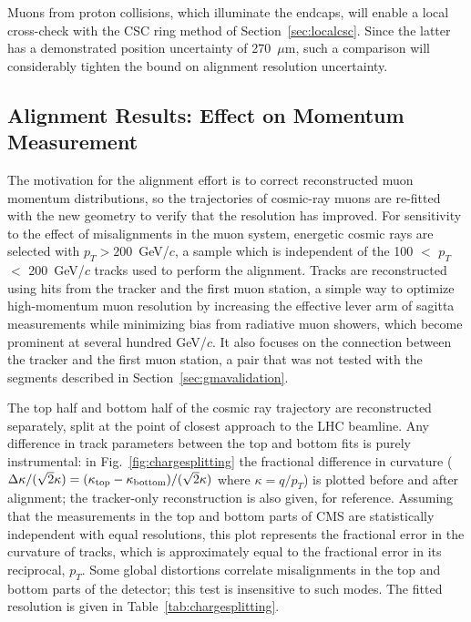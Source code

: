 \documentclass[11pt,twoside,a4paper,cmspaper]{cms-tdr}
\begin{document}
Muons from proton collisions, which illuminate the endcaps,
will enable a local cross-check with the CSC ring method of
Section~\ref{sec:localcsc}.  Since the latter has a demonstrated
position uncertainty of 270~$\mu$m, such a comparison will
considerably tighten the bound on alignment resolution uncertainty.

\subsection{Alignment Results: Effect on Momentum Measurement}
\label{sec:momentum}

The motivation for the alignment effort is to correct reconstructed
muon momentum distributions, so the trajectories of
cosmic-ray muons are re-fitted with the new geometry to verify that the resolution
has improved.  For sensitivity to the effect of misalignments in the muon
system, energetic cosmic rays are selected with $p_T > 200$~GeV/$c$, a
sample which is independent of the 100 $<$ $p_T$ $<$ 200~GeV/$c$
tracks used to perform the alignment.  Tracks are reconstructed using
hits from the tracker and the first muon station, a simple way to
optimize high-momentum muon resolution by increasing the effective
lever arm of sagitta measurements while minimizing bias from radiative
muon showers, which become prominent at several hundred GeV/$c$.  It
also focuses on the connection between the tracker and the first muon
station, a pair that was not tested with the segments described
in Section~\ref{sec:gmavalidation}.

The top half and bottom half of the cosmic ray trajectory are
reconstructed separately, split at the point of closest approach to
the LHC beamline.  Any difference in track parameters between the top
and bottom fits is purely instrumental: in
Fig.~\ref{fig:chargesplitting} the fractional difference in
curvature ($\Delta \kappa/(\sqrt{2}\kappa) =
(\kappa_{\mbox{\scriptsize top}} - \kappa_{\mbox{\scriptsize
bottom}})/(\sqrt{2}\kappa)$ where $\kappa = q/p_T$) is plotted before and after
alignment; the tracker-only reconstruction is also given, for
reference.  Assuming that the measurements in the top and bottom parts
of CMS are statistically independent with equal
resolutions, this plot represents the fractional error in the
curvature of tracks, which is approximately equal to the fractional
error in its reciprocal, $p_T$.  Some global distortions correlate
misalignments in the top and bottom parts of the detector; this test is
insensitive to such modes.  The fitted resolution is given in
Table~\ref{tab:chargesplitting}.
\end{document}
